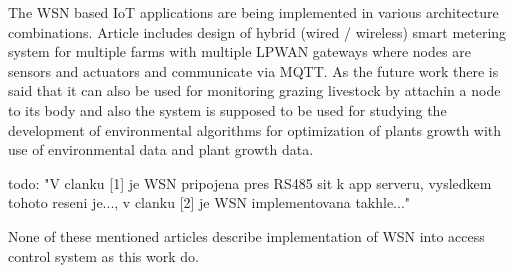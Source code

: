 The WSN based IoT applications are being implemented in various architecture combinations.
Article \cite{Implement Smart Farm with IoT Technology} includes design of hybrid (wired / wireless) smart metering system for multiple farms with multiple LPWAN gateways where nodes are sensors and actuators and communicate via MQTT. 
As the future work there is said that it can also be used for monitoring grazing livestock by attachin a node to its body and also the system is supposed to be used for studying the development of environmental algorithms for optimization of plants growth with use of environmental data and plant growth data.


todo: "V clanku [1] je WSN pripojena pres RS485 sit k app serveru, vysledkem tohoto reseni je..., v clanku [2] je WSN implementovana takhle..."



None of these mentioned articles describe implementation of WSN into access control system as this work do.






























